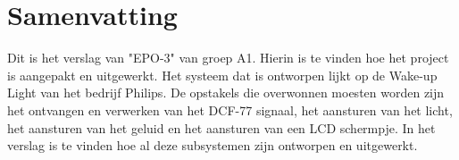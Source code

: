 \chapter{Samenvatting}
Dit is het verslag van "EPO-3" van groep A1. Hierin is te vinden hoe het project is aangepakt en uitgewerkt. Het systeem dat is ontworpen lijkt op de Wake-up Light van het bedrijf Philips. De opstakels die overwonnen moesten worden zijn het ontvangen en verwerken van het DCF-77 signaal, het aansturen van het licht, het aansturen van het geluid en het aansturen van een LCD schermpje. In het verslag is te vinden hoe al deze subsystemen zijn ontworpen en uitgewerkt. 